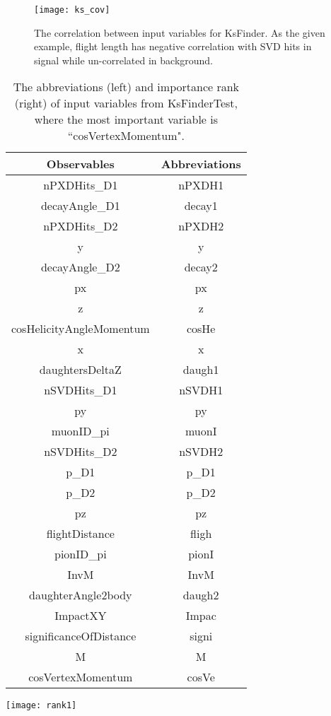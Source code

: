 \begin{figure}[ht]
\centering
\texttt{[image: ks\_cov]}
\caption{The correlation between input variables for KsFinder. As the given example, flight length has negative correlation with SVD hits in signal while un-correlated in background.}
\label{fig:ks_cov}
\end{figure}

 \begin{table}[htpb]
 	\begin{minipage}[ht]{0.5\linewidth}
 		\centering
 		\begin{tabular}{c|c}
 			\hline
 			Observables &  Abbreviations\\
 			\hline
 			nPXDHits\_D1 &  nPXDH1 \\
 			decayAngle\_D1 & decay1 \\
 			nPXDHits\_D2 & nPXDH2\\
 			y & y \\
 			decayAngle\_D2 & decay2\\
 			px & px\\
 			z & z \\
 			cosHelicityAngleMomentum & cosHe\\
 			x & x \\
 			daughtersDeltaZ & daugh1\\
 			nSVDHits\_D1 & nSVDH1\\
 			py & py\\
 			muonID\_pi & muonI\\
 			nSVDHits\_D2 & nSVDH2\\
 			p\_D1 & p\_D1\\
 			p\_D2 & p\_D2\\
 			pz & pz \\
 			flightDistance & fligh\\
 			pionID\_pi & pionI\\
 			InvM & InvM \\
 			daughterAngle2body & daugh2\\
 			ImpactXY & Impac \\
 			significanceOfDistance & signi \\
 			M & M \\
 			cosVertexMomentum & cosVe \\
 			\hline
 		\end{tabular}
 	\end{minipage}
 	\begin{minipage}[ht]{0.5\linewidth}
 		\centering 
 		\texttt{[image: rank1]}
 	\end{minipage}
 \caption{The abbreviations (left) and importance rank (right) of input variables from KsFinderTest, where the most important variable is ``cosVertexMomentum".}
 \label{tab:ks_import}
 \end{table}




